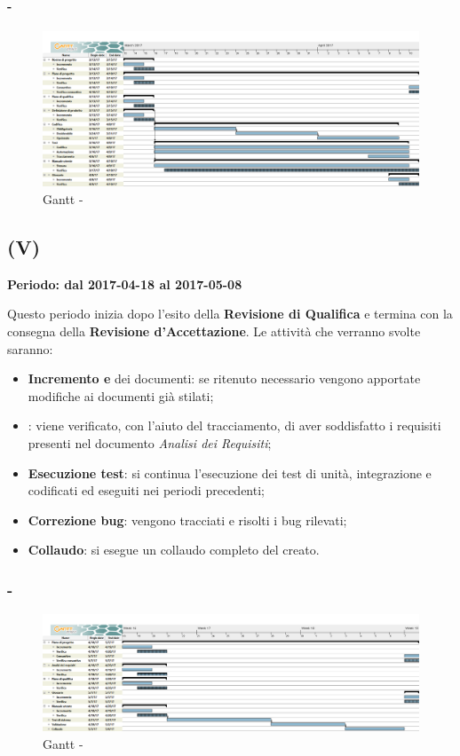 \documentclass[./PianoDiProgetto.tex]{subfiles}
\begin{document}
  \newpage
  \paragraph{ - \PerC}
    \begin{figure}[!h]
    \centering
    \includegraphics[width=\textwidth]{images/C}
    \caption{Gantt - \PerC}
    \end{figure}

  \subsection{\PerV (V)}
  \textbf{Periodo: dal 2017-04-18 al 2017-05-08}

  Questo periodo inizia dopo l'esito della \textbf{Revisione di Qualifica} e termina con la consegna della \textbf{Revisione d'Accettazione}. Le attività che verranno svolte saranno:
  \begin{itemize}
    \item \textbf{Incremento e } dei documenti: se ritenuto necessario vengono apportate modifiche ai documenti già stilati;
    \item \textbf{}: viene verificato, con l'aiuto del tracciamento, di aver soddisfatto i requisiti presenti nel documento \textit{Analisi dei Requisiti};
    \item \textbf{Esecuzione test}: si continua l'esecuzione dei test di unità, integrazione e  codificati ed eseguiti nei periodi precedenti;
    \item \textbf{Correzione bug}: vengono tracciati e risolti i bug rilevati;
    \item \textbf{Collaudo}: si esegue un collaudo completo del  creato.
  \end{itemize}

  \subsubsection{ - \PerV}
    \begin{figure}[!h]
    \centering
    \includegraphics[width=\textwidth]{images/V}
    \caption{Gantt - \PerV}
    \end{figure}
\end{document}
